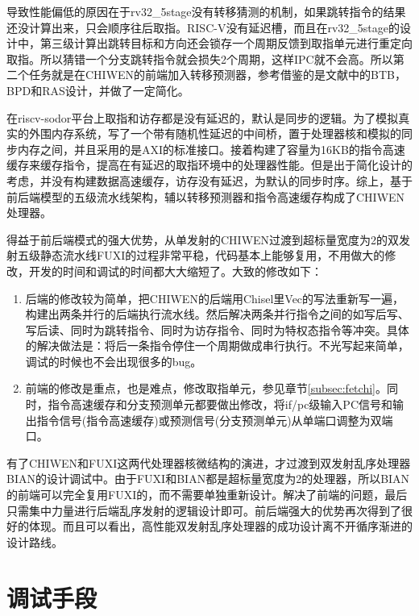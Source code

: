 导致性能偏低的原因在于rv32\_5stage没有转移猜测的机制，如果跳转指令的结果还没计算出来，只会顺序往后取指。RISC-V没有延迟槽，而且在rv32\_5stage的设计中，第三级计算出跳转目标和方向还会锁存一个周期反馈到取指单元进行重定向取指。所以猜错一个分支跳转指令就会损失2个周期，这样IPC就不会高。所以第二个任务就是在CHIWEN的前端加入转移预测器，参考借鉴的是文献\citet{Celio:EECS-2017-157}中的BTB，BPD和RAS设计，并做了一定简化。

在riscv-sodor平台上取指和访存都是没有延迟的，默认是同步的逻辑。为了模拟真实的外围内存系统，写了一个带有随机性延迟的中间桥，置于处理器核和模拟的同步内存之间，并且采用的是AXI的标准接口。接着构建了容量为16KB的指令高速缓存来缓存指令，提高在有延迟的取指环境中的处理器性能。但是出于简化设计的考虑，并没有构建数据高速缓存，访存没有延迟，为默认的同步时序。综上，基于前后端模型的五级流水线架构，辅以转移预测器和指令高速缓存构成了CHIWEN处理器。

得益于前后端模式的强大优势，从单发射的CHIWEN过渡到超标量宽度为2的双发射五级静态流水线FUXI的过程非常平稳，代码基本上能够复用，不用做大的修改，开发的时间和调试的时间都大大缩短了。大致的修改如下：
\begin{enumerate}[label=(\alph*)]
	\item 后端的修改较为简单，把CHIWEN的后端用Chisel里Vec的写法重新写一遍，构建出两条并行的后端执行流水线。然后解决两条并行指令之间的如写后写、写后读、同时为跳转指令、同时为访存指令、同时为特权态指令等冲突。具体的解决做法是：将后一条指令停住一个周期做成串行执行。不光写起来简单，调试的时候也不会出现很多的bug。
	\item 前端的修改是重点，也是难点，修改取指单元，参见章节\ref{subsec:fetchi}。同时，指令高速缓存和分支预测单元都要做出修改，将if/pc级输入PC信号和输出指令信号(指令高速缓存)或预测信号(分支预测单元)从单端口调整为双端口。
\end{enumerate}

有了CHIWEN和FUXI这两代处理器核微结构的演进，才过渡到双发射乱序处理器BIAN的设计调试中。由于FUXI和BIAN都是超标量宽度为2的处理器，所以BIAN的前端可以完全复用FUXI的，而不需要单独重新设计。解决了前端的问题，最后只需集中力量进行后端乱序发射的逻辑设计即可。前后端强大的优势再次得到了很好的体现。而且可以看出，高性能双发射乱序处理器的成功设计离不开循序渐进的设计路线。

\section{调试手段}

